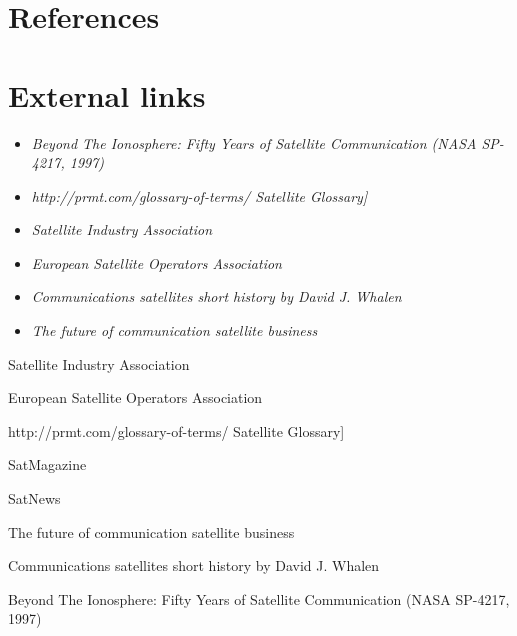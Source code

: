 \section{References}\label{references}

\section{External links}\label{external-links}

\begin{itemize}
\item
  \emph{Beyond The Ionosphere: Fifty Years of Satellite Communication
  (NASA SP-4217, 1997)}
\item
  \emph{http://prmt.com/glossary-of-terms/ Satellite Glossary{]}}
\item
  \emph{Satellite Industry Association}
\item
  \emph{European Satellite Operators Association}
\item
  \emph{Communications satellites short history by David J. Whalen}
\item
  \emph{The future of communication satellite business}
\end{itemize}

Satellite Industry Association

European Satellite Operators Association

http://prmt.com/glossary-of-terms/ Satellite Glossary{]}

SatMagazine

SatNews

The future of communication satellite business

Communications satellites short history by David J. Whalen

Beyond The Ionosphere: Fifty Years of Satellite Communication (NASA
SP-4217, 1997)
